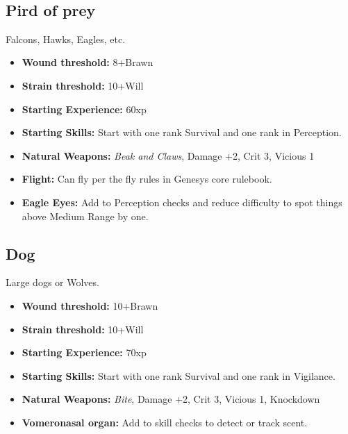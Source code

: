 \documentclass{book}
\begin{document}
\mbox{ }

\begin{multicols}{2}
	\subsection{Pird of prey}	
	Falcons, Hawks, Eagles, etc.
	
	\begin{itemize}
		\item \textbf{Wound threshold:} 8+Brawn
		\item \textbf{Strain threshold:} 10+Will
		\item \textbf{Starting Experience:} 60xp
		\item \textbf{Starting Skills:} Start with one rank Survival and one rank in Perception.
		\item \textbf{Natural Weapons:} \textit{Beak and Claws}, Damage +2, Crit 3, Vicious 1
		\item \textbf{Flight:} Can fly per the fly rules in Genesys core rulebook.
		\item \textbf{Eagle Eyes:} Add \BoostDie to Perception checks and reduce difficulty to spot things above Medium Range by one.		
	\end{itemize}

	\subsection{Dog}	
	Large dogs or Wolves.
	
	\begin{itemize}
		\item \textbf{Wound threshold:} 10+Brawn
		\item \textbf{Strain threshold:} 10+Will
		\item \textbf{Starting Experience:} 70xp
		\item \textbf{Starting Skills:} Start with one rank Survival and one rank in Vigilance.
		\item \textbf{Natural Weapons:} \textit{Bite}, Damage +2, Crit 3, Vicious 1, Knockdown
		\item \textbf{Vomeronasal organ:} Add \BoostDie \BoostDie to skill checks to detect or track scent.		
	\end{itemize}
\end{multicols}
\clearpage
\mbox{ }
\end{document}
